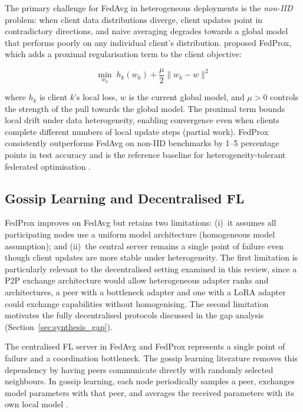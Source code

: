 The primary challenge for FedAvg in heterogeneous deployments is the \textit{non-IID}
problem: when client data distributions diverge, client updates point in contradictory
directions, and naive averaging degrades towards a global model that performs poorly
on any individual client's distribution. \citet{Li2020FedProx} proposed FedProx, which
adds a proximal regularisation term to the client objective:

\begin{equation}
\min_{w_k} \; h_k(w_k) + \frac{\mu}{2} \|w_k - w\|^2
\label{eq:fedprox}
\end{equation}

where $h_k$ is client $k$'s local loss, $w$ is the current global model, and $\mu > 0$
controls the strength of the pull towards the global model. The proximal term bounds
local drift under data heterogeneity, enabling convergence even when clients complete
different numbers of local update steps (partial work). FedProx consistently outperforms
FedAvg on non-IID benchmarks by 1--5 percentage points in test accuracy and is the
reference baseline for heterogeneity-tolerant federated optimisation \citep{Li2020FedProx}.

\subsection{Gossip Learning and Decentralised FL}
\label{sec:p2p_federated:gossip}

FedProx improves on FedAvg but retains two limitations: (i)~it assumes all participating nodes use 
a uniform model architecture (homogeneous model assumption); and (ii)~the central server remains 
a single point of failure even though client updates are more stable under heterogeneity. 
The first limitation is particularly relevant to the decentralised setting examined in this review, 
since a P2P exchange architecture would allow heterogeneous adapter ranks and architectures, a peer with a bottleneck adapter and one with a LoRA adapter could exchange capabilities without homogenising. 
The second limitation motivates the fully decentralised protocols discussed in the gap analysis (Section~\ref{sec:synthesis_gap}).

The centralised FL server in FedAvg and FedProx represents a single point of failure and
a coordination bottleneck. The gossip learning literature removes this dependency by
having peers communicate directly with randomly selected neighbours. In gossip learning,
each node periodically samples a peer, exchanges model parameters with that peer, and
averages the received parameters with its own local model \citep{OrmandyGossip2013}.

